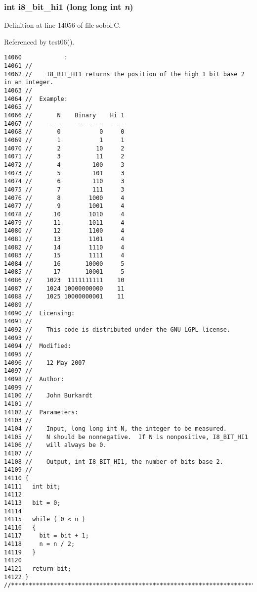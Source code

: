 \subsubsection{\setlength{\rightskip}{0pt plus 5cm}int i8\_\-bit\_\-hi1 (long long int {\em n})}\label{sobol_8C_0408258878e3de2ac2afd7943cf56c7c}




Definition at line 14056 of file sobol.C.

Referenced by test06().

\begin{Code}\begin{verbatim}14060            :
14061 //
14062 //    I8_BIT_HI1 returns the position of the high 1 bit base 2 in an integer.
14063 //
14064 //  Example:
14065 //
14066 //       N    Binary    Hi 1
14067 //    ----    --------  ----
14068 //       0           0     0
14069 //       1           1     1
14070 //       2          10     2
14071 //       3          11     2 
14072 //       4         100     3
14073 //       5         101     3
14074 //       6         110     3
14075 //       7         111     3
14076 //       8        1000     4
14077 //       9        1001     4
14078 //      10        1010     4
14079 //      11        1011     4
14080 //      12        1100     4
14081 //      13        1101     4
14082 //      14        1110     4
14083 //      15        1111     4
14084 //      16       10000     5
14085 //      17       10001     5
14086 //    1023  1111111111    10
14087 //    1024 10000000000    11
14088 //    1025 10000000001    11
14089 //
14090 //  Licensing:
14091 //
14092 //    This code is distributed under the GNU LGPL license. 
14093 //
14094 //  Modified:
14095 //
14096 //    12 May 2007
14097 //
14098 //  Author:
14099 //
14100 //    John Burkardt
14101 //
14102 //  Parameters:
14103 //
14104 //    Input, long long int N, the integer to be measured.
14105 //    N should be nonnegative.  If N is nonpositive, I8_BIT_HI1
14106 //    will always be 0.
14107 //
14108 //    Output, int I8_BIT_HI1, the number of bits base 2.
14109 //
14110 {
14111   int bit;
14112 
14113   bit = 0;
14114 
14115   while ( 0 < n )
14116   {
14117     bit = bit + 1;
14118     n = n / 2;
14119   }
14120 
14121   return bit;
14122 }
//****************************************************************************80
\end{verbatim}
\end{Code}


